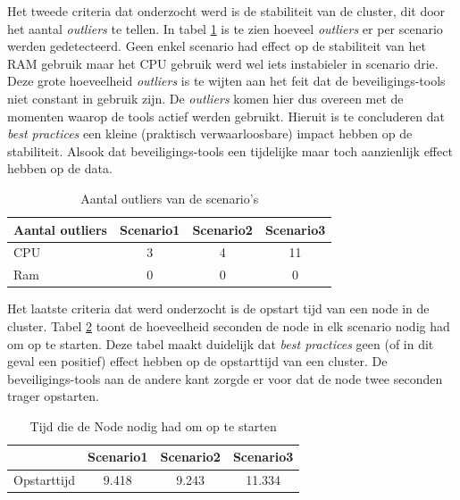 Het tweede criteria dat onderzocht werd is de stabiliteit van de cluster, dit door het aantal \textit{outliers} te tellen. In tabel \ref{tab:Outliers} is te zien hoeveel \textit{outliers} er per scenario werden gedetecteerd. Geen enkel scenario had effect op de stabiliteit van het RAM gebruik maar het CPU gebruik werd wel iets instabieler in scenario drie. Deze grote hoeveelheid \textit{outliers} is te wijten aan het feit dat de beveiligings-tools niet constant in gebruik zijn. De \textit{outliers} komen hier dus overeen met de momenten waarop de tools actief werden gebruikt. Hieruit is te concluderen dat \textit{best practices} een kleine (praktisch verwaarloosbare) impact hebben op de stabiliteit. Alsook dat beveiligings-tools een tijdelijke maar toch aanzienlijk effect hebben op de data.
%
\begin{table}[h]
	\centering
	\begin{tabular}{lccc}
		Aantal outliers & Scenario1 & Scenario2 & Scenario3 \\ \hline
		CPU             & 3         & 4         & 11        \\ \hline
		Ram             & 0         & 0         & 0        
	\end{tabular}
	\caption{Aantal outliers van de scenario's}
	\label{tab:Outliers}
\end{table}

Het laatste criteria dat werd onderzocht is de opstart tijd van een node in de cluster. Tabel \ref{tab:BootTime} toont de hoeveelheid seconden de node in elk scenario nodig had om op te starten. Deze tabel maakt duidelijk dat \textit{best practices} geen (of in dit geval een positief) effect hebben op de opstarttijd van een cluster. De beveiligings-tools aan de andere kant zorgde er voor dat de node twee seconden trager opstarten. 

\begin{table}[h]
	\centering
	\begin{tabular}{lccc}
		& Scenario1 & Scenario2 & Scenario3 \\ \hline
		Opstarttijd & 9.418     & 9.243     & 11.334   
	\end{tabular}
	\caption{Tijd die de Node nodig had om op te starten}
	\label{tab:BootTime}
\end{table}


